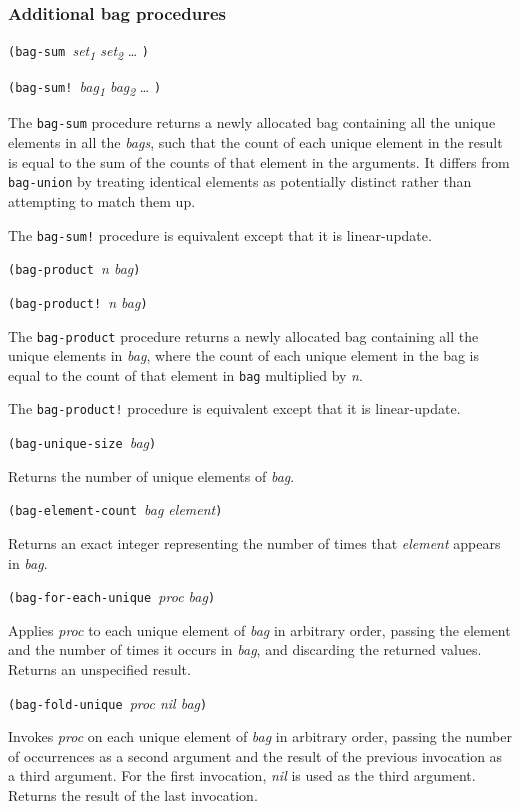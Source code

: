 \hypertarget{Additionalbagprocedures}{\subsubsection{Additional bag
procedures}\label{Additionalbagprocedures}}

\texttt{(bag-sum\ }\emph{set\textsubscript{1} set\textsubscript{2}}
\ldots{} \texttt{)}

\texttt{(bag-sum!\ }\emph{bag\textsubscript{1} bag\textsubscript{2}}
\ldots{} \texttt{)}

The \texttt{bag-sum} procedure returns a newly allocated bag containing
all the unique elements in all the \emph{bags}, such that the count of
each unique element in the result is equal to the sum of the counts of
that element in the arguments. It differs from \texttt{bag-union} by
treating identical elements as potentially distinct rather than
attempting to match them up.

The \texttt{bag-sum!} procedure is equivalent except that it is
linear-update.

\texttt{(bag-product\ }\emph{n bag}\texttt{)}

\texttt{(bag-product!\ }\emph{n bag}\texttt{)}

The \texttt{bag-product} procedure returns a newly allocated bag
containing all the unique elements in \emph{bag}, where the count of
each unique element in the bag is equal to the count of that element in
\texttt{bag} multiplied by \emph{n}.

The \texttt{bag-product!} procedure is equivalent except that it is
linear-update.

\texttt{(bag-unique-size\ }\emph{bag}\texttt{)}

Returns the number of unique elements of \emph{bag}.

\texttt{(bag-element-count\ }\emph{bag element}\texttt{)}

Returns an exact integer representing the number of times that
\emph{element} appears in \emph{bag}.

\texttt{(bag-for-each-unique\ }\emph{proc bag}\texttt{)}

Applies \emph{proc} to each unique element of \emph{bag} in arbitrary
order, passing the element and the number of times it occurs in
\emph{bag}, and discarding the returned values. Returns an unspecified
result.

\texttt{(bag-fold-unique\ }\emph{proc nil bag}\texttt{)}

Invokes \emph{proc} on each unique element of \emph{bag} in arbitrary
order, passing the number of occurrences as a second argument and the
result of the previous invocation as a third argument. For the first
invocation, \emph{nil} is used as the third argument. Returns the result
of the last invocation.

